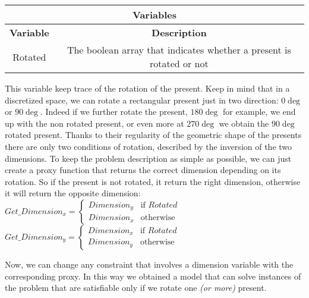 \begin{center}
		\begin{tabular}{|c|c|}
			\hline
			\multicolumn{2}{|c|}{\textbf{Variables}} \\
			\hline
			\textbf{Variable} & {\textbf{Description}} \\
			\hline
			Rotated & The boolean array that indicates whether a present is rotated or not \\
			\hline
		\end{tabular}
\end{center}

This variable keep trace of the rotation of the present. Keep in mind that in a discretized space, we can rotate a rectangular present just in two direction: $0\deg$ or $90\deg$.
Indeed if we further rotate the present, $180\deg$ for example, we end up with the non rotated present, or even more at $270\deg$ we obtain the $90\deg$ rotated present.
Thanks to their regularity of the geometric shape of the presents there are only two conditions of rotation, described by the inversion of the two dimensions.
To keep the problem description as simple as possible, we can just create a proxy function that returns the correct dimension depending on its rotation.
So if the present is not rotated, it return the right dimension, otherwise it will return the opposite dimension:\\
$
Get\_Dimension_x = 
\begin{cases}
	Dimension_y & \text{if } Rotated \\
	Dimension_x & \text{otherwise}
\end{cases}
$
\\
$
Get\_Dimension_y = 
\begin{cases}
	Dimension_x & \text{if } Rotated \\
	Dimension_y & \text{otherwise}
\end{cases}
$

Now, we can change any constraint that involves a dimension variable with the corresponding proxy.
In this way we obtained a model that can solve instances of the problem that are satisfiable only if we rotate one \textit{(or more)} present.

